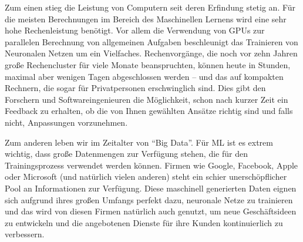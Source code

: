 Zum einen stieg die Leistung von Computern seit deren Erfindung stetig an. Für die meisten Berechnungen im Bereich des Maschinellen Lernens wird eine sehr hohe Rechenleistung benötigt. Vor allem die Verwendung von GPUs zur parallelen Berechnung von allgemeinen Aufgaben beschleunigt das Trainieren von Neuronalen Netzen um ein Vielfaches. Rechenvorgänge, die noch vor zehn Jahren große Rechencluster für viele Monate beanspruchten, können heute in Stunden, maximal aber wenigen Tagen abgeschlossen werden -- und das auf kompakten Rechnern, die sogar für Privatpersonen erschwinglich sind. Dies gibt den Forschern und Softwareingenieuren die Möglichkeit, schon nach kurzer Zeit ein Feedback zu erhalten, ob die von Ihnen gewählten Ansätze richtig sind und falls nicht, Anpassungen vorzunehmen.

Zum anderen leben wir im Zeitalter von "`Big Data"'. Für \gls{ML} ist es extrem wichtig, dass große Datenmengen zur Verfügung stehen, die für den Trainingsprozess verwendet werden können. Firmen wie Google, Facebook, Apple oder Microsoft (und natürlich vielen anderen) steht ein schier unerschöpflicher Pool an Informationen zur Verfügung. Diese maschinell generierten Daten eignen sich aufgrund ihres großen Umfangs perfekt dazu, neuronale Netze zu trainieren und das wird von diesen Firmen natürlich auch genutzt, um neue Geschäftsideen zu entwickeln und die angebotenen Dienste für ihre Kunden kontinuierlich zu verbessern.